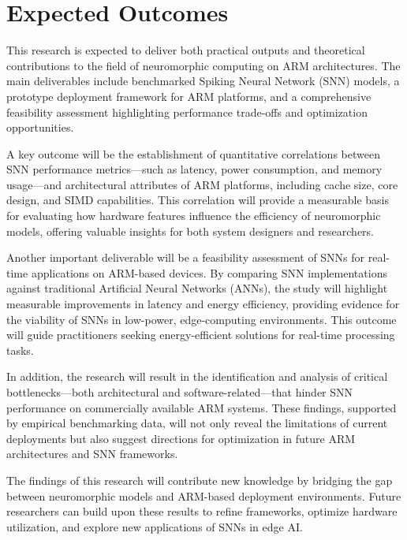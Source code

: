 \documentclass[a4paper,12pt]{article}
\begin{document}
	\section{Expected Outcomes}
	This research is expected to deliver both practical outputs and theoretical contributions to the field of neuromorphic computing on ARM architectures. The main deliverables include benchmarked Spiking Neural Network (SNN) models, a prototype deployment framework for ARM platforms, and a comprehensive feasibility assessment highlighting performance trade-offs and optimization opportunities.
	
	A key outcome will be the establishment of quantitative correlations between SNN performance metrics—such as latency, power consumption, and memory usage—and architectural attributes of ARM platforms, including cache size, core design, and SIMD capabilities. This correlation will provide a measurable basis for evaluating how hardware features influence the efficiency of neuromorphic models, offering valuable insights for both system designers and researchers.
	
	Another important deliverable will be a feasibility assessment of SNNs for real-time applications on ARM-based devices. By comparing SNN implementations against traditional Artificial Neural Networks (ANNs), the study will highlight measurable improvements in latency and energy efficiency, providing evidence for the viability of SNNs in low-power, edge-computing environments. This outcome will guide practitioners seeking energy-efficient solutions for real-time processing tasks.
	
	In addition, the research will result in the identification and analysis of critical bottlenecks—both architectural and software-related—that hinder SNN performance on commercially available ARM systems. These findings, supported by empirical benchmarking data, will not only reveal the limitations of current deployments but also suggest directions for optimization in future ARM architectures and SNN frameworks.
	
	The findings of this research will contribute new knowledge by bridging the gap between neuromorphic models and ARM-based deployment environments. Future researchers can build upon these results to refine frameworks, optimize hardware utilization, and explore new applications of SNNs in edge AI.
	
\end{document}
